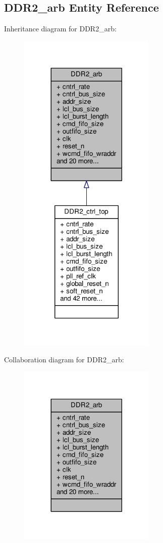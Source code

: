 \subsection{D\+D\+R2\+\_\+arb Entity Reference}
\label{classDDR2__arb}


Inheritance diagram for D\+D\+R2\+\_\+arb\+:\nopagebreak
\begin{figure}[H]
\begin{center}
\leavevmode
\includegraphics[width=185pt]{d0/dd9/classDDR2__arb__inherit__graph}
\end{center}
\end{figure}


Collaboration diagram for D\+D\+R2\+\_\+arb\+:\nopagebreak
\begin{figure}[H]
\begin{center}
\leavevmode
\includegraphics[width=185pt]{da/d63/classDDR2__arb__coll__graph}
\end{center}
\end{figure}
